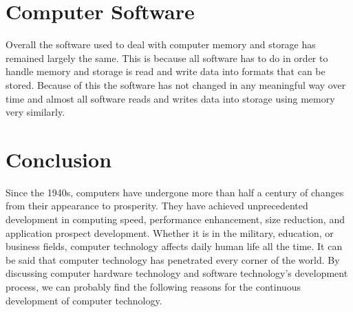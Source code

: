 \documentclass{article}
\begin{document}
\section{Computer Software}
Overall the software used to deal with computer memory and storage has remained largely the same. This is because all software has to do in order to handle memory and storage is read and write data into formats that can be stored. Because of this the software has not changed in any meaningful way over time and almost all software reads and writes data into storage using memory very similarly.
\section{Conclusion}
Since the 1940s, computers have undergone more than half a century of changes from their appearance to prosperity. They have achieved unprecedented development in computing speed, performance enhancement, size reduction, and application prospect development. Whether it is in the military, education, or business fields, computer technology affects daily human life all the time. It can be said that computer technology has penetrated every corner of the world. By discussing computer hardware technology and software technology's development process, we can probably find the following reasons for the continuous development of computer technology.  
\end{document}
